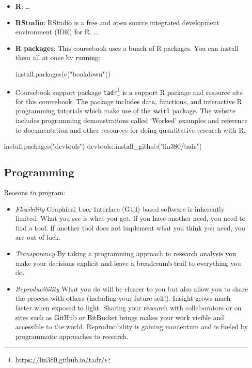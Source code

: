 \documentclass[
]{article}
\newenvironment{Shaded}{\begin{snugshade}}{\end{snugshade}}
\newcommand{\FunctionTok}[1]{\textcolor[rgb]{0.00,0.00,0.00}{#1}}
\newcommand{\NormalTok}[1]{#1}
\newcommand{\SpecialCharTok}[1]{\textcolor[rgb]{0.00,0.00,0.00}{#1}}
\newcommand{\StringTok}[1]{\textcolor[rgb]{0.31,0.60,0.02}{#1}}
\DeclareRobustCommand{\href}[2]{#2\footnote{\url{#1}}}
\providecommand{\tightlist}{%
  \setlength{\itemsep}{0pt}\setlength{\parskip}{0pt}}
\begin{document}
\begin{itemize}
\item
  \textbf{R}: \ldots{}
\item
  \textbf{RStudio}: RStudio is a free and open source integrated development environment (IDE) for R. \ldots{}
\item
  \textbf{R packages}: This coursebook uses a bunch of R packages.
  You can install them all at once by running:

\begin{Shaded}
\begin{Highlighting}[]
\FunctionTok{install.packages}\NormalTok{(}\FunctionTok{c}\NormalTok{(}\StringTok{"bookdown"}\NormalTok{))}
\end{Highlighting}
\end{Shaded}
\item
  Coursebook support package
  \href{https://lin380.github.io/tadr/}{\texttt{tadr}} is a support R package and resource site for this coursebook. The package includes data, functions, and interactive R programming tutorials which make use of the \texttt{swirl} package. The website includes programming demonstrations called `Worked' examples and reference to documentation and other resources for doing quantitative research with R.
\end{itemize}

\begin{Shaded}
\begin{Highlighting}[]
\FunctionTok{install.packages}\NormalTok{(}\StringTok{"devtools"}\NormalTok{)}
\NormalTok{devtools}\SpecialCharTok{::}\FunctionTok{install\_github}\NormalTok{(}\StringTok{"lin380/tadr"}\NormalTok{)}
\end{Highlighting}
\end{Shaded}

\hypertarget{programming}{%
\subsection{Programming}\label{programming}}

Reasons to program:

\begin{itemize}
\tightlist
\item
  \emph{Flexibility} Graphical User Interface (GUI) based software is inherently limited. What you see is what you get. If you have another need, you need to find a tool. If another tool does not implement what you think you need, you are out of luck.
\item
  \emph{Transparency} By taking a programming approach to research analysis you make your decisions explicit and leave a breadcrumb trail to everything you do.
\item
  \emph{Reproducibility} What you do will be clearer to you but also allow you to share the process with others (including your future self!). Insight grows much faster when exposed to light. Sharing your research with collaborators or on sites such as GitHub or BitBucket brings makes your work visible and accessible to the world. Reproducibility is gaining momentum and is fueled by programmatic approaches to research.
\end{itemize}
\end{document}
